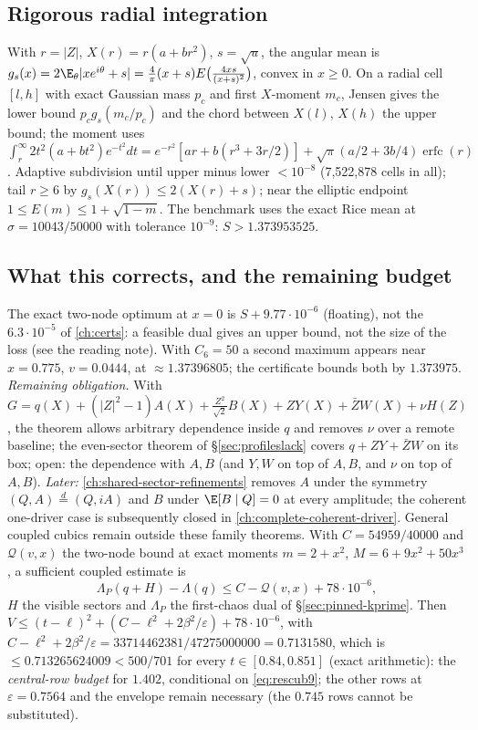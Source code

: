 \subsection{Rigorous radial integration}
With $r=|Z|$, $X(r)=r(a+br^2)$, $s=\sqrt u$, the angular mean is $g_s(x)=2\E_\theta|xe^{i\theta}+s|=\frac4\pi(x+s)E\bigl(\frac{4xs}{(x+s)^2}\bigr)$, convex in $x\ge0$. On a radial cell $[l,h]$ with exact
Gaussian mass $p_c$ and first $X$-moment $m_c$, Jensen gives the lower bound $p_cg_s(m_c/p_c)$ and the chord between $X(l)$, $X(h)$ the upper bound; the moment uses
$\int_r^\infty2t^2(a+bt^2)e^{-t^2}dt=e^{-r^2}[ar+b(r^3+3r/2)]+\sqrt\pi(a/2+3b/4)\operatorname{erfc}(r)$. Adaptive subdivision until upper minus lower $<10^{-8}$ (7,522,878 cells in all); tail $r\ge6$ by
$g_s(X(r))\le2(X(r)+s)$; near the elliptic endpoint $1\le E(m)\le1+\sqrt{1-m}$. The benchmark uses the exact Rice mean at $\sigma=10043/50000$ with tolerance $10^{-9}$: $S>1.373953525$.

\subsection{What this corrects, and the remaining budget}\label{sec:rescub-budget}
The exact two-node optimum at $x=0$ is $S+9.77\cdot10^{-6}$ (floating), not the $6.3\cdot10^{-5}$ of \autoref{ch:certs}: a feasible dual gives an upper bound, not the size of the loss
(see the reading note). With $C_6=50$ a second maximum appears near $x=0.775$, $v=0.0444$, at $\approx1.37396805$; the certificate bounds both by $1.373975$.
\emph{Remaining obligation.} With $G=q(X)+(|Z|^2-1)A(X)+\frac{Z^2}{\sqrt2}B(X)+ZY(X)+\bar ZW(X)+\nu H(Z)$, the theorem allows arbitrary dependence inside $q$ and removes $\nu$ over a remote
baseline; the even-sector theorem of \S\ref{sec:profileslack} covers $q+ZY+\bar ZW$ on its box; open: the dependence with $A,B$ (and $Y,W$ on top of $A,B$, and $\nu$ on top of $A,B$). \emph{Later:} \autoref{ch:shared-sector-refinements} removes $A$ under the symmetry
$(Q,A)\overset d=(Q,iA)$ and $B$ under $\E[B\mid Q]=0$ at every amplitude; the coherent one-driver case is subsequently closed in \autoref{ch:complete-coherent-driver}. General coupled cubics remain outside these family theorems. With
$C=54959/40000$ and $\mathcal Q(v,x)$ the two-node bound at exact moments $m=2+x^2$, $M=6+9x^2+50x^3$, a sufficient coupled estimate is
\begin{equation}\label{eq:rescub9}
\Lambda_P(q+H)-\Lambda(q)\le C-\mathcal Q(v,x)+78\cdot10^{-6},
\end{equation}
$H$ the visible sectors and $\Lambda_P$ the first-chaos dual of \S\ref{sec:pinned-kprime}. Then $V\le(t-\ell)^2+(C-\ell^2+2\beta^2/\varepsilon)+78\cdot10^{-6}$, with
$C-\ell^2+2\beta^2/\varepsilon=33714462381/47275000000=0.7131580$, which is $\le0.713265624009<500/701$ for every $t\in[0.84,0.851]$ (exact arithmetic): the \emph{central-row budget} for $1.402$,
conditional on \eqref{eq:rescub9}; the other rows at $\varepsilon=0.7564$ and the envelope remain necessary (the $0.745$ rows cannot be substituted).

